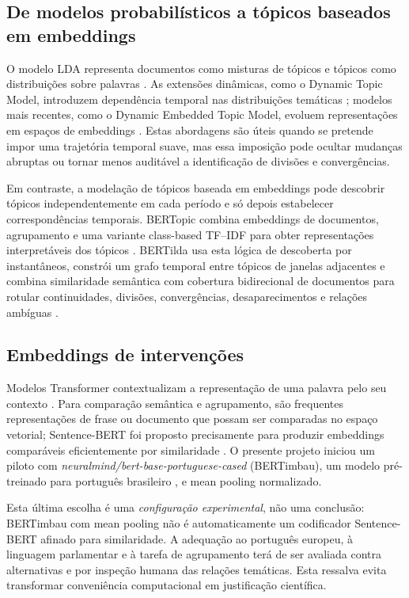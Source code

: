 \documentclass[11pt,a4paper]{article}
\begin{document}
\subsection{De modelos probabilísticos a tópicos baseados em embeddings}

O modelo LDA representa documentos como misturas de tópicos e tópicos como distribuições sobre palavras \citep{blei2003lda}. As extensões dinâmicas, como o Dynamic Topic Model, introduzem dependência temporal nas distribuições temáticas \citep{bleilafferty2006dtm}; modelos mais recentes, como o Dynamic Embedded Topic Model, evoluem representações em espaços de embeddings \citep{dieng2019detm}. Estas abordagens são úteis quando se pretende impor uma trajetória temporal suave, mas essa imposição pode ocultar mudanças abruptas ou tornar menos auditável a identificação de divisões e convergências.

Em contraste, a modelação de tópicos baseada em embeddings pode descobrir tópicos independentemente em cada período e só depois estabelecer correspondências temporais. BERTopic combina embeddings de documentos, agrupamento e uma variante class-based TF--IDF para obter representações interpretáveis dos tópicos \citep{grootendorst2022bertopic}. BERTilda usa esta lógica de descoberta por instantâneos, constrói um grafo temporal entre tópicos de janelas adjacentes e combina similaridade semântica com cobertura bidirecional de documentos para rotular continuidades, divisões, convergências, desaparecimentos e relações ambíguas \citep{oliveirafigueira2026bertilda}.

\subsection{Embeddings de intervenções}

Modelos Transformer contextualizam a representação de uma palavra pelo seu contexto \citep{devlin2019bert}. Para comparação semântica e agrupamento, são frequentes representações de frase ou documento que possam ser comparadas no espaço vetorial; Sentence-BERT foi proposto precisamente para produzir embeddings comparáveis eficientemente por similaridade \citep{reimersgurevych2019sbert}. O presente projeto iniciou um piloto com \textit{neuralmind/bert-base-portuguese-cased} (BERTimbau), um modelo pré-treinado para português brasileiro \citep{souza2020bertimbau}, e mean pooling normalizado.

Esta última escolha é uma \emph{configuração experimental}, não uma conclusão: BERTimbau com mean pooling não é automaticamente um codificador Sentence-BERT afinado para similaridade. A adequação ao português europeu, à linguagem parlamentar e à tarefa de agrupamento terá de ser avaliada contra alternativas e por inspeção humana das relações temáticas. Esta ressalva evita transformar conveniência computacional em justificação científica.
\end{document}
